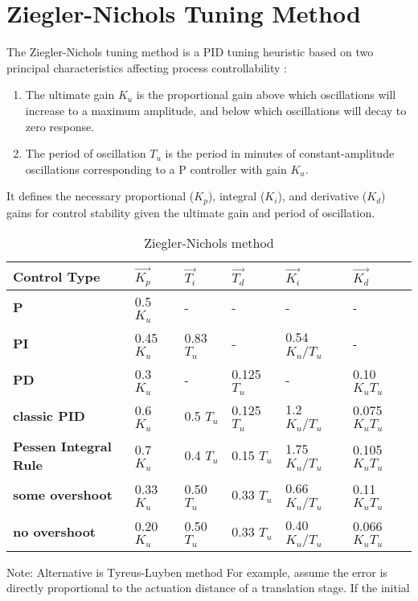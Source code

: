 \section{Ziegler-Nichols Tuning Method}
The Ziegler-Nichols tuning method is a PID tuning heuristic based on two principal characteristics affecting process controllability \cite{ziegler1942optimum}:
\begin{enumerate}
    \item The ultimate gain $K_u$ is the proportional gain above which oscillations will increase to a maximum amplitude, and below which oscillations will decay to zero response.
    \item The period of oscillation $T_u$ is the period in minutes of constant-amplitude oscillations corresponding to a P controller with gain $K_u$.
\end{enumerate}
It defines the necessary proportional ($K_p$), integral ($K_i$), and derivative ($K_d$) gains for control stability given the ultimate gain and period of oscillation.

\begin{table}[htbp]
    \renewcommand{\arraystretch}{1.25}
    \caption{Ziegler-Nichols method}
    \begin{center}
        \begin{tabular}{ l l l l l l }
        \toprule[2pt]
         \textbf{Control Type} & $\vec{K_p}$ & $\vec{T_i}$ & $\vec{T_d}$ & $\vec{K_i}$ & $\vec{K_d}$ \\
         \midrule[0.75pt]
         \textbf{P} & 0.5 $K_u$ & - & - & - & - \\
         \textbf{PI} & 0.45 $K_u$ & 0.83 $T_u$ & - & 0.54 $K_u/T_u$ & - \\
         \textbf{PD} & 0.3 $K_u$ & - & 0.125 $T_u$ & - & 0.10 $K_u T_u$ \\
         \textbf{classic PID} & 0.6 $K_u$ & 0.5 $T_u$ & 0.125 $T_u$ & 1.2 $K_u/T_u$ & 0.075 $K_u T_u$ \\
         \textbf{Pessen Integral Rule} & 0.7 $K_u$ & 0.4 $T_u$ & 0.15 $T_u$ & 1.75 $K_u/T_u$ & 0.105 $K_u T_u$ \\
         \textbf{some overshoot} & 0.33 $K_u$ & 0.50 $T_u$ & 0.33 $T_u$ & 0.66 $K_u/T_u$ & 0.11 $K_u T_u$ \\
         \textbf{no overshoot} & 0.20 $K_u$ & 0.50 $T_u$ & 0.33 $T_u$ & 0.40 $K_u/T_u$ & 0.066 $K_u T_u$ \\
         \bottomrule[2pt]
        \end{tabular}
        \label{tab:ziegler-nichols}
    \end{center}
\end{table}

Note: Alternative is Tyreus-Luyben method \cite{luyben1986simple}
For example, assume the error is directly proportional to the actuation distance of a translation stage. If the initial